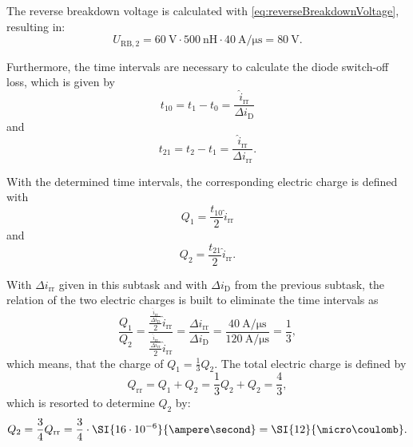 \begin{solutionblock}
    The reverse breakdown voltage is calculated with \eqref{eq:reverseBreakdownVoltage}, resulting in:
    \begin{equation}
        U_{\mathrm{RB,2}} = \SI{60}{\volt} \cdot \SI{500}{\nano\henry} \cdot \SI{40}{\ampere\per\micro\second} = \SI{80}{\volt}.
        \label{eq:RB_2}
    \end{equation}

    Furthermore, the time intervals are necessary to calculate the diode switch-off loss, which is given by  
    \begin{equation}
        t_{10} = t_1 - t_0 = \frac{\hat{i}_{\mathrm{rr}}}{\Delta i_{\mathrm{D}}}
    \end{equation}
    and
    \begin{equation}
        t_{21} = t_2 - t_1 = \frac{\hat{i}_{\mathrm{rr}}}{\Delta i_{\mathrm{rr}}}.
    \end{equation}

    With the determined time intervals, the corresponding electric charge is defined with
    \begin{equation}
        Q_1 = \frac{t_{10}}{2}\hat{i}_{\mathrm{rr}}
    \end{equation}
    and
    \begin{equation}
        Q_2 = \frac{t_{21}}{2} \hat{i}_{\mathrm{rr}}.
    \end{equation}

    With $\Delta i_{\mathrm{rr}}$ given in this subtask and with $\Delta i_{\mathrm{D}}$ from the previous subtask, the relation of the two electric charges is built to eliminate the time intervals as
    \begin{equation}
        \frac{Q_{1}}{Q_{2}} = \frac{\frac{\frac{\hat{i}_{\mathrm{rr}}}{\Delta i_{\mathrm{D}}}}{2}\hat{i}_{\mathrm{rr}}}{\frac{\frac{\hat{i}_{\mathrm{rr}}}{\Delta i_{\mathrm{rr}}}}{2}\hat{i}_{\mathrm{rr}}} 
        = \frac{\Delta i_{\mathrm{rr}}}{\Delta i_{\mathrm{D}}}
        = \frac{\SI{40}{\ampere\per\micro\second}}{\SI{120}{\ampere\per\micro\second}}
        = \frac{1}{3},
    \end{equation}
    which means, that the charge of $Q_1 = \frac{1}{3} Q_2$.
    The total electric charge is defined by
    \begin{equation}
        Q_{\mathrm{rr}} = Q_1 + Q_2 = \frac{1}{3}Q_2 + Q_2 = \frac{4}{3},
    \end{equation}
    which is resorted to determine $Q_2$ by:
    \begin{equation}
        Q_2 = \frac{3}{4}Q_{\mathrm{rr}} = \frac{3}{4}\cdot \SI{16\cdot10^{-6}}{\ampere\second}
        = \SI{12}{\micro\coulomb}.
    \end{equation}


\end{solutionblock}
